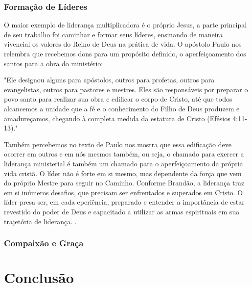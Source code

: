 \documentclass[
	12pt,				%
	openright,			%
	twoside,			%
	a4paper,			%
	english,			%
	french,				%
	spanish,			%
	brazil				%
	]{abntex2}
\begin{document}
\subsection{Formação de Líderes}

O maior exemplo de liderança multiplicadora é o próprio Jesus, a parte principal de seu trabalho foi caminhar e formar seus líderes, ensinando de maneira vivencial os valores do Reino de Deus na prática de vida. O apóstolo Paulo nos relembra que recebemos dons para um propósito definido, o aperfeiçoamento dos santos para a obra do ministério: \begin{citacao}"Ele designou alguns para apóstolos, outros para profetas, outros para evangelistas, outros para pastores e mestres. Eles são responsáveis por preparar o povo santo para realizar sua obra e edificar o corpo de Cristo, até que todos alcancemos a unidade que a fé e o conhecimento do Filho de Deus produzem e amadureçamos, chegando à completa medida da estatura de Cristo (Efésios 4:11-13)."\end{citacao}

Também percebemos no texto de Paulo nos mostra que essa edificação deve ocorrer em outros e em nós mesmos também, ou seja, o chamado para exercer a liderança ministerial é também um chamado para o aperfeiçoamento da própria vida cristã. O líder não é forte em si mesmo, mas dependente da força que vem do próprio Mestre para seguir no Caminho\cite[130,131]{brandao}. Conforme Brandão, a liderança traz em si inúmeros desafios, que precisam ser enfrentados e superados em Cristo. O líder presa ser, em cada eperiência, preparado e entender a importância de estar revestido do poder de Deus e capacitado a utilizar as armas espirituais em sua trajetória de liderança. \cite[132]{brandao}.



\subsection{Compaixão e Graça}

\chapter{Conclusão}


\end{document}
